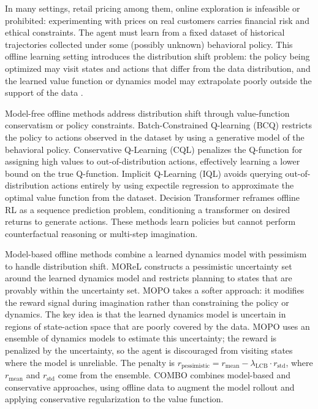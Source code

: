 In many settings, retail pricing among them, online exploration is infeasible or prohibited: experimenting with prices on real customers carries financial risk and ethical constraints. The agent must learn from a fixed dataset of historical trajectories collected under some (possibly unknown) behavioral policy. This offline learning setting introduces the distribution shift problem: the policy being optimized may visit states and actions that differ from the data distribution, and the learned value function or dynamics model may extrapolate poorly outside the support of the data \citep{levine2020offline}.

Model-free offline methods address distribution shift through value-function conservatism or policy constraints. Batch-Constrained Q-learning (BCQ) \citep{fujimoto2019bcq} restricts the policy to actions observed in the dataset by using a generative model of the behavioral policy. Conservative Q-Learning (CQL) \citep{kumar2020cql} penalizes the Q-function for assigning high values to out-of-distribution actions, effectively learning a lower bound on the true Q-function. Implicit Q-Learning (IQL) \citep{kostrikov2022iql} avoids querying out-of-distribution actions entirely by using expectile regression to approximate the optimal value function from the dataset. Decision Transformer \citep{chen2021decision} reframes offline RL as a sequence prediction problem, conditioning a transformer on desired returns to generate actions. These methods learn policies but cannot perform counterfactual reasoning or multi-step imagination.

Model-based offline methods combine a learned dynamics model with pessimism to handle distribution shift. MOReL \citep{kidambi2020morel} constructs a pessimistic uncertainty set around the learned dynamics model and restricts planning to states that are provably within the uncertainty set. MOPO \citep{yu2020mopo} takes a softer approach: it modifies the reward signal during imagination rather than constraining the policy or dynamics. The key idea is that the learned dynamics model is uncertain in regions of state-action space that are poorly covered by the data. MOPO uses an ensemble of dynamics models to estimate this uncertainty; the reward is penalized by the uncertainty, so the agent is discouraged from visiting states where the model is unreliable. The penalty is $r_{\text{pessimistic}} = r_{\text{mean}} - \lambda_{\text{LCB}} \cdot r_{\text{std}}$, where $r_{\text{mean}}$ and $r_{\text{std}}$ come from the ensemble. COMBO \citep{yu2021combo} combines model-based and conservative approaches, using offline data to augment the model rollout and applying conservative regularization to the value function.

